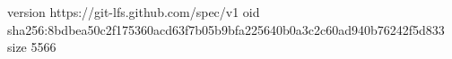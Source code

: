 version https://git-lfs.github.com/spec/v1
oid sha256:8bdbea50c2f175360acd63f7b05b9bfa225640b0a3c2c60ad940b76242f5d833
size 5566

